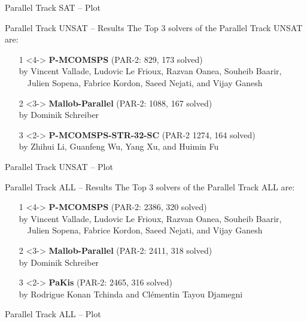 \documentclass[trans]{beamer}
\begin{document}
\begin{frame}{Parallel Track SAT -- Plot}
\centering
{}
\end{frame}


\begin{frame}{Parallel Track UNSAT -- Results}
The Top 3 solvers of the Parallel Track UNSAT are:
\begin{itemize}

\item[1]<4-> {\bf P-MCOMSPS} (PAR-2: 829, 173 solved)\\
by Vincent Vallade, Ludovic Le Frioux, Razvan Oanea, Souheib Baarir, \\~~Julien Sopena, Fabrice Kordon, Saeed Nejati, and Vijay Ganesh
\item[2]<3-> {\bf Mallob-Parallel} (PAR-2: 1088, 167 solved)\\
by Dominik Schreiber
\item[3]<2-> {\bf P-MCOMSPS-STR-32-SC} (PAR-2 1274, 164 solved)\\
by Zhihui Li, Guanfeng Wu, Yang Xu, and Huimin Fu
\end{itemize}
\end{frame}


\begin{frame}{Parallel Track UNSAT -- Plot}
\centering
\resizebox{.9\textwidth}{!}{%

}
\end{frame}

\begin{frame}{Parallel Track ALL -- Results}
The Top 3 solvers of the Parallel Track ALL are:
\begin{itemize}
\item[1]<4-> {\bf P-MCOMSPS} (PAR-2: 2386, 320 solved)\\
by Vincent Vallade, Ludovic Le Frioux, Razvan Oanea, Souheib Baarir, \\~~Julien Sopena, Fabrice Kordon, Saeed Nejati, and Vijay Ganesh
\item[2]<3-> {\bf Mallob-Parallel} (PAR-2: 2411, 318 solved)\\
by Dominik Schreiber
\item[3]<2-> {\bf PaKis} (PAR-2: 2465, 316 solved)\\
by Rodrigue Konan Tchinda and Clémentin Tayou Djamegni
\end{itemize}
\end{frame}

\begin{frame}{Parallel Track ALL -- Plot}
\centering
\resizebox{.9\textwidth}{!}{%

}

\end{frame}
\end{document}
